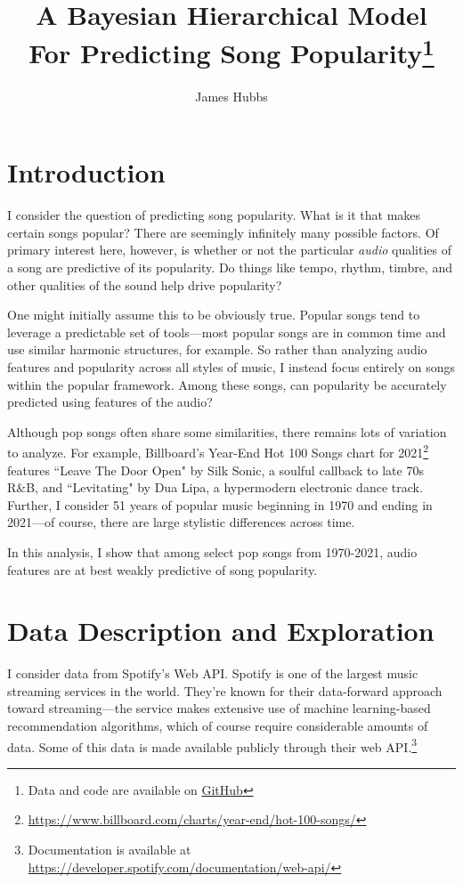 \documentclass[12pt, twoside]{article}
\title{A Bayesian Hierarchical Model \\ For Predicting Song Popularity\footnote{Data and code are available on \href{https://github.com/james-hubbs/A-Bayesian-Hierarchical-Model-For-Predicting-Song-Popularity}{GitHub}}}
\author{James Hubbs}
\begin{document}
\onehalfspacing %
\maketitle

\section{Introduction}
I consider the question of predicting song popularity. What is it that makes certain songs popular? There are seemingly infinitely many possible factors. Of primary interest here, however, is whether or not the particular \textit{audio} qualities of a song are predictive of its popularity. Do things like tempo, rhythm, timbre, and other qualities of the sound help drive popularity?

One might initially assume this to be obviously true. Popular songs tend to leverage a predictable set of tools---most popular songs are in common time and use similar harmonic structures, for example. So rather than analyzing audio features and popularity across all styles of music, I instead focus entirely on songs within the popular framework. Among these songs, can popularity be accurately predicted using features of the audio? 

Although pop songs often share some similarities, there remains lots of variation to analyze. For example, Billboard's Year-End Hot 100 Songs chart for 2021\footnote{\href{https://www.billboard.com/charts/year-end/hot-100-songs/}{https://www.billboard.com/charts/year-end/hot-100-songs/}} features ``Leave The Door Open" by Silk Sonic, a soulful callback to late 70s R\&B, and ``Levitating" by Dua Lipa, a hypermodern electronic dance track. Further, I consider 51 years of popular music beginning in 1970 and ending in 2021---of course, there are large stylistic differences across time. 

In this analysis, I show that among select pop songs from 1970-2021, audio features are at best weakly predictive of song popularity. 

\section{Data Description and Exploration}
I consider data from Spotify's Web API. Spotify is one of the largest music streaming services in the world. They're known for their data-forward approach toward streaming---the service makes extensive use of machine learning-based recommendation algorithms, which of course require considerable amounts of data. Some of this data is made available publicly through their web API.\footnote{Documentation is available at \href{https://developer.spotify.com/documentation/web-api/}{https://developer.spotify.com/documentation/web-api/}}
\end{document}
